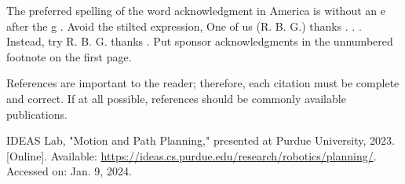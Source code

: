 \documentclass[letterpaper, 10 pt, conference]{ieeeconf}  %
\begin{document}
The preferred spelling of the word  acknowledgment  in America is without an  e  after the  g . Avoid the stilted expression,  One of us (R. B. G.) thanks . . .   Instead, try  R. B. G. thanks . Put sponsor acknowledgments in the unnumbered footnote on the first page.




References are important to the reader; therefore, each citation must be complete and correct. If at all possible, references should be commonly available publications.



\begin{thebibliography}{99}
	
	IDEAS Lab, "Motion and Path Planning," presented at Purdue University, 2023. [Online]. Available: \url{https://ideas.cs.purdue.edu/research/robotics/planning/}. Accessed on: Jan. 9, 2024.
	


\end{thebibliography}
\end{document}
